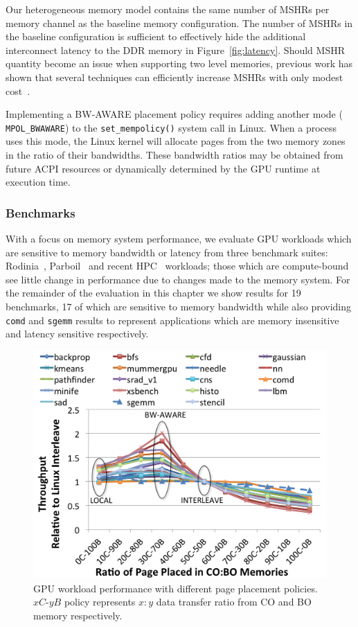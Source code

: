 Our heterogeneous memory model contains the same number of MSHRs per memory
channel as the baseline memory configuration.  The number of MSHRs in the
baseline configuration is sufficient to effectively hide the additional
interconnect latency to the DDR memory in Figure~\ref{fig:latency}. Should MSHR
quantity become an issue when supporting two level memories, previous work has
shown that several techniques can efficiently increase MSHRs with only modest
cost~\cite{ref:tuck:scalablemisshandling, ref:minikin:prefetch}.

Implementing a BW-AWARE placement policy requires adding another mode ({\tt
MPOL\_BWAWARE}) to the {\tt set\_mempolicy()} system call in Linux\@. When a
process uses this mode, the Linux kernel will allocate pages from the two memory
zones in the ratio of their bandwidths.  These bandwidth ratios may be obtained
from future ACPI resources or dynamically determined by the GPU runtime at
execution time.

\subsubsection{Benchmarks}
With a focus on memory system performance, we evaluate GPU workloads which are
sensitive to memory bandwidth or latency from three benchmark suites:
Rodinia~\cite{Che2009}, Parboil~\cite{Parboil} and recent
HPC~\cite{comd,cns,minife,xsbench} workloads; those which are compute-bound see
little change in performance due to changes made to the memory system.  For the
remainder of the evaluation in this chapter we show results for 19 benchmarks,
17 of which are sensitive to memory bandwidth while also providing {\tt comd}
and {\tt sgemm} results to represent applications which are memory insensitive
and latency sensitive respectively.


\begin{figure}[t]
    \centering
    \includegraphics[width=0.9\columnwidth]{asplos2015/figures/bw-aware-2.png} 
    \caption{GPU workload performance with different page placement policies.
$xC$-$yB$ policy represents $x:y$ data transfer ratio from CO and BO memory respectively.}
    \label{fig:baseline}
\end{figure}

